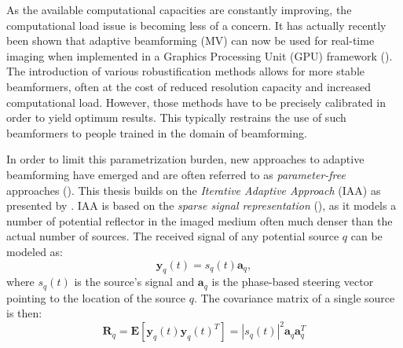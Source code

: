 As the available computational capacities are constantly improving, the computational load issue is becoming less of a concern. It has actually recently been shown that adaptive beamforming (MV) can now be used for real-time imaging when implemented in a Graphics Processing Unit (GPU) framework (\cite{GPU}).
The introduction of various robustification methods allows for more stable beamformers, often at the cost of reduced resolution capacity and increased computational load. However, those methods have to be precisely calibrated in order to yield optimum results. This typically restrains the use of such beamformers to people trained in the domain of beamforming.

In order to limit this parametrization burden, new approaches to adaptive beamforming have emerged and are often referred to as \textit{parameter-free} approaches (\cite{Yardibi_nonparametric_IAA, Yardibi, Du_parameter_free, Jensen_IAA}). This thesis builds on the \textit{Iterative Adaptive Approach} (IAA) as presented by \cite{Jensen_IAA}. IAA is based on the \textit{sparse signal representation} (\cite{Yardibi_nonparametric_IAA}), as it models a number of potential reflector in the imaged medium often much denser than the actual number of sources. The received signal of any potential source $q$ can be modeled as:
\begin{equation}
    \boldsymbol{y}_q(t) = s_q(t)  \boldsymbol{a}_q,
\end{equation}
\noindent
where $s_q(t)$ is the source's signal and $\boldsymbol{a}_q$ is the phase-based steering vector pointing to the location of the source $q$. The covariance matrix of a single source is then:
\begin{equation}
    \boldsymbol{R}_q = \boldsymbol{E}[\boldsymbol{y}_q(t) \boldsymbol{y}_q(t)^T] = |s_q(t)|^2 \boldsymbol{a}_q \boldsymbol{a}_q^T
\end{equation}


